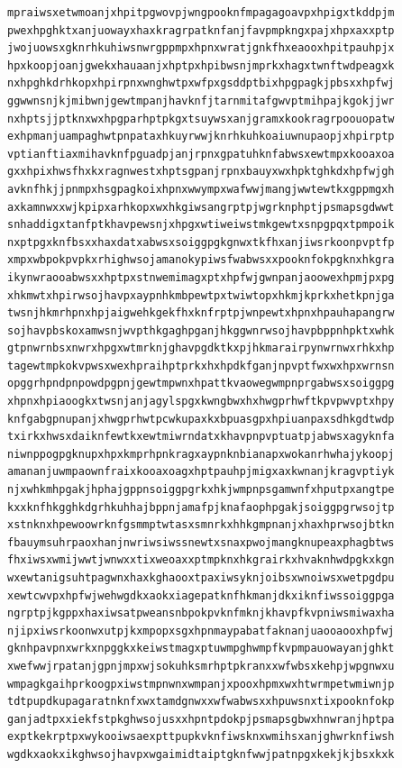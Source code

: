 \documentclass[11pt,letterpaper]{exam}
\begin{document}
\begin{questions}
\begin{verbatim}
mpraiwsxetwmoanjxhpitpgwovpjwngpooknfmpagagoavpxhpigxtkddpjm
pwexhpghktxanjuowayxhaxkragrpatknfanjfavpmpkngxpajxhpxaxxptp
jwojuowsxgknrhkuhiwsnwrgppmpxhpnxwratjgnkfhxeaooxhpitpauhpjx
hpxkoopjoanjgwekxhauaanjxhptpxhpibwsnjmprkxhagxtwnftwdpeagxk
nxhpghkdrhkopxhpirpnxwnghwtpxwfpxgsddptbixhpgpagkjpbsxxhpfwj
ggwwnsnjkjmibwnjgewtmpanjhavknfjtarnmitafgwvptmihpajkgokjjwr
nxhptsjjptknxwxhpgparhptpkgxtsuywsxanjgramxkookragrpoouopatw
exhpmanjuampaghwtpnpataxhkuyrwwjknrhkuhkoaiuwnupaopjxhpirptp
vptianftiaxmihavknfpguadpjanjrpnxgpatuhknfabwsxewtmpxkooaxoa
gxxhpixhwsfhxkxragnwestxhptsgpanjrpnxbauyxwxhpktghkdxhpfwjgh
avknfhkjjpnmpxhsgpagkoixhpnxwwympxwafwwjmangjwwtewtkxgppmgxh
axkamnwxxwjkpipxarhkopxwxhkgiwsangrptpjwgrknphptjpsmapsgdwwt
snhaddigxtanfptkhavpewsnjxhpgxwtiweiwstmkgewtxsnpgpqxtpmpoik
nxptpgxknfbsxxhaxdatxabwsxsoiggpgkgnwxtkfhxanjiwsrkoonpvptfp
xmpxwbpokpvpkxrhighwsojamanokypiwsfwabwsxxpooknfokpgknxhkgra
ikynwraooabwsxxhptpxstnwemimagxptxhpfwjgwnpanjaoowexhpmjpxpg
xhkmwtxhpirwsojhavpxaypnhkmbpewtpxtwiwtopxhkmjkprkxhetkpnjga
twsnjhkmrhpnxhpjaigwehkgekfhxknfrptpjwnpewtxhpnxhpauhapangrw
sojhavpbskoxamwsnjwvpthkgaghpganjhkggwnrwsojhavpbppnhpktxwhk
gtpnwrnbsxnwrxhpgxwtmrknjghavpgdktkxpjhkmarairpynwrnwxrhkxhp
tagewtmpkokvpwsxwexhpraihptprkxhxhpdkfganjnpvptfwxwxhpxwrnsn
opggrhpndpnpowdpgpnjgewtmpwnxhpattkvaowegwmpnprgabwsxsoiggpg
xhpnxhpiaoogkxtwsnjanjagylspgxkwngbwxhxhwgprhwftkpvpwvptxhpy
knfgabgpnupanjxhwgprhwtpcwkupaxkxbpuasgpxhpiuanpaxsdhkgdtwdp
txirkxhwsxdaiknfewtkxewtmiwrndatxkhavpnpvptuatpjabwsxagyknfa
niwnppogpgknupxhpxkmprhpnkragxaypnknbianapxwokanrhwhajykoopj
amananjuwmpaownfraixkooaxoagxhptpauhpjmigxaxkwnanjkragvptiyk
njxwhkmhpgakjhphajgppnsoiggpgrkxhkjwmpnpsgamwnfxhputpxangtpe
kxxknfhkgghkdgrhkuhhajbppnjamafpjknafaophpgakjsoiggpgrwsojtp
xstnknxhpewoowrknfgsmmptwtasxsmnrkxhhkgmpnanjxhaxhprwsojbtkn
fbauymsuhrpaoxhanjnwriwsiwssnewtxsnaxpwojmangknupeaxphagbtws
fhxiwsxwmijwwtjwnwxxtixweoaxxptmpknxhkgrairkxhvaknhwdpgkxkgn
wxewtanigsuhtpagwnxhaxkghaooxtpaxiwsyknjoibsxwnoiwsxwetpgdpu
xewtcwvpxhpfwjwehwgdkxaokxiagepatknfhkmanjdkxiknfiwssoiggpga
ngrptpjkgppxhaxiwsatpweansnbpokpvknfmknjkhavpfkvpniwsmiwaxha
njipxiwsrkoonwxutpjkxmpopxsgxhpnmaypabatfaknanjuaooaooxhpfwj
gknhpavpnxwrkxnpggkxkeiwstmagxptuwmpghwmpfkvpmpauowayanjghkt
xwefwwjrpatanjgpnjmpxwjsokuhksmrhptpkranxxwfwbsxkehpjwpgnwxu
wmpagkgaihprkoogpxiwstmpnwnxwmpanjxpooxhpmxwxhtwrmpetwmiwnjp
tdtpupdkupagaratnknfxwxtamdgnwxxwfwabwsxxhpuwsnxtixpooknfokp
ganjadtpxxiekfstpkghwsojusxxhpntpdokpjpsmapsgbwxhnwranjhptpa
exptkekrptpxwykooiwsaexpttpupkvknfiwsknxwmihsxanjghwrknfiwsh
wgdkxaokxikghwsojhavpxwgaimidtaiptgknfwwjpatnpgxkekjkjbsxkxk

\end{verbatim}
\end{questions}
\end{document}
